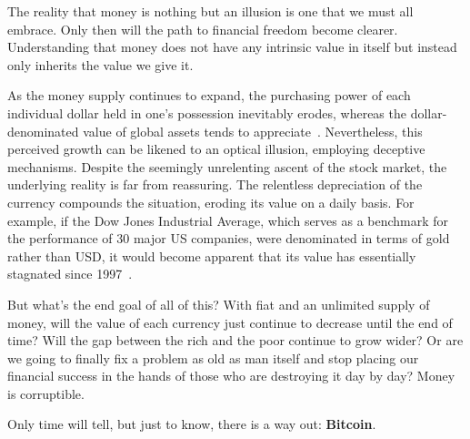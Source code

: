 The reality that money is nothing but an illusion is one that we must all embrace. Only then will the path to financial
freedom become clearer. Understanding that money does not have any intrinsic value in itself but instead only inherits the
value we give it.

As the money supply continues to expand, the purchasing power of each individual dollar held in one's possession inevitably
erodes, whereas the dollar-denominated value of global assets tends to appreciate~\cite{moneyprinting}. Nevertheless, this
perceived growth can be likened to an optical illusion, employing deceptive mechanisms. Despite the seemingly unrelenting
ascent of the stock market, the underlying reality is far from reassuring. The relentless depreciation of the currency
compounds the situation, eroding its value on a daily basis. For example, if the Dow Jones Industrial Average, which serves
as a benchmark for the performance of 30 major US companies, were denominated in terms of gold rather than USD, it would
become apparent that its value has essentially stagnated since 1997~\cite{stockmarketillusion}.

But what's the end goal of all of this? With fiat and an unlimited supply of money, will the value of each currency just
continue to decrease until the end of time? Will the gap between the rich and the poor continue to grow wider? Or are we
going to finally fix a problem as old as man itself and stop placing our financial success in the hands of those who are
destroying it day by day? Money is corruptible.

Only time will tell, but just to know, there is a way out: \textbf{Bitcoin}.
